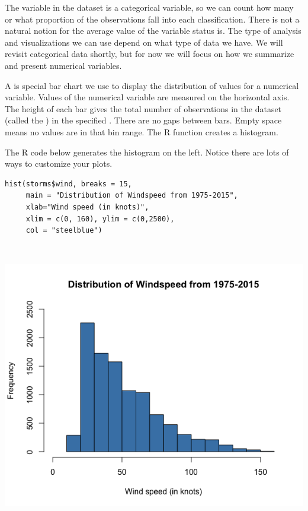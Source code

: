 The variable \textbf{} in the dataset  \textbf{}  is a categorical variable, so we can count how many or what proportion of the observations fall into each classification. There is not a natural notion for the average value of the variable status is. The type of analysis and visualizations we can use depend on what type of data we have. We will revisit categorical data shortly, but for now we will focus on how we summarize and present numerical variables.

\clearpage


\bbox
A \textbf{} is special bar chart we use to display the distribution of values for a numerical variable.
\bi
\ii Values of the numerical variable are measured on the horizontal axis.
\ii The height of each bar gives the total number of observations in the dataset (called the \textbf{}) in the specified \textbf{}. 
\ii There are no gaps between bars. Empty space means no values are in that bin range.
\ii The R function \textbf{} creates a histogram.
\ei
\ebox

 The R code below generates the histogram on the left. Notice there are lots of ways to customize your plots.

\begin{multicols}{2}

\begin{lstlisting}
hist(storms$wind, breaks = 15,
     main = "Distribution of Windspeed from 1975-2015",
     xlab="Wind speed (in knots)",
     xlim = c(0, 160), ylim = c(0,2500), 
     col = "steelblue")
\end{lstlisting}

\columnbreak

\ \vspace{0.35in}

\includegraphics[width=0.4\tw]{02/fig-wind-hist.png}

\end{multicols}


